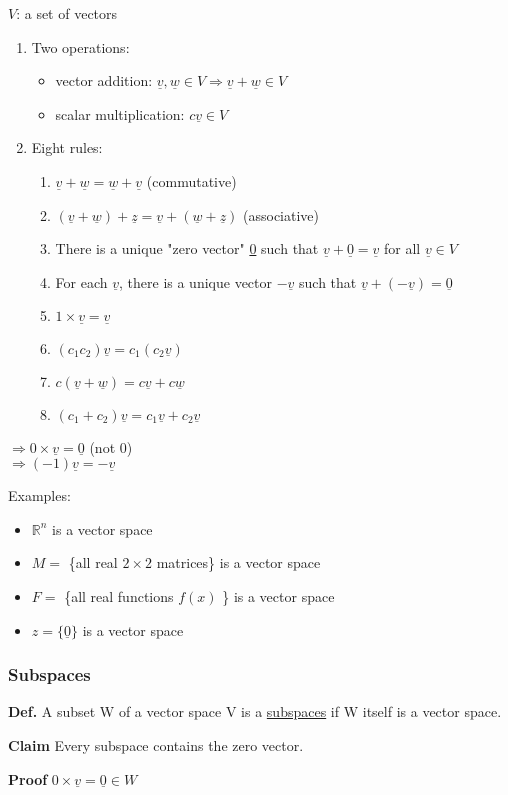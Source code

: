 \documentclass[12pt,a4paper]{article}
\begin{document}
$V$: a set of vectors
\begin{enumerate}
  \item Two operations:
  \begin{itemize}
    \item vector addition: $\underline{v}, \underline{w} \in V \Rightarrow \underline{v} + \underline{w} \in V$
    \item scalar multiplication: $c \underline{v} \in V$
  \end{itemize}
  \item Eight rules:
  \begin{enumerate}
    \item $\underline{v} + \underline{w} = \underline{w} + \underline{v}$ (commutative)
    \item $(\underline{v} + \underline{w}) + \underline{z} = \underline{v} + (\underline{w} + \underline{z})$ (associative)
    \item There is a unique "zero vector" \underline{0} such that $\underline{v} + \underline{0} = \underline{v}$ for all $\underline{v} \in V$
    \item For each $\underline{v}$, there is a unique vector $-\underline{v}$ such that $\underline{v} + (-\underline{v}) = \underline{0}$
    \item $1 \times \underline{v} = \underline{v}$
    \item $(c_1c_2)\underline{v} = c_1(c_2\underline{v})$
    \item $c(\underline{v} + \underline{w}) = c\underline{v} + c\underline{w}$
    \item $(c_1 + c_2)\underline{v} = c_1\underline{v} + c_2\underline{v}$
  \end{enumerate}
\end{enumerate}

$\Rightarrow 0 \times \underline{v}  = \underline{0}$  (not 0) \\
$\Rightarrow (-1)\underline{v} = -\underline{v}$

Examples:

\begin{itemize}
  \item $\mathbb{R}^n$ is a vector space
  \item $M =$ \{all real $2 \times 2$ matrices\} is a vector space
  \item $F =$ \{all real functions $f(x)$ \} is a vector space
  \item $z = \{ \underline{0} \}$ is a vector space
\end{itemize}

\subsubsection*{Subspaces}

\textbf{Def.} A subset W of a vector space V is a \underline{subspaces} if W itself is a vector space.

\textbf{Claim} Every subspace contains the zero vector.

\textbf{Proof} $ 0 \times \underline{v} = \underline{0} \in W$
\end{document}

